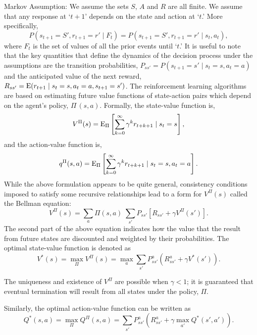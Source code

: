 \noindent Markov Assumption: We assume the sets $S$, $A$ and $R$ are all finite. We assume that any response at `$t+1$' depends on the state and action at `$t$.' More specifically, 
	\begin{equation} \label{eqn:pstpone}
	P(s_{t+1}=S', r_{t+1}=r'  \;|\; F_t)= P(s_{t+1}=S', r_{t+1}=r'  \;|\; s_t,a_t),
	\end{equation}
where $F_t$ is the set of values of all the prior events until `$t$.' It is useful to note that the key quantities that define the dynamics of the decision process under the assumptions are the transition probabilities, $P_{ss'}= P(s_{t+1}=s' \;|\; s_t=s, a_t=a)$ and the anticipated value of the next reward, $R_{ss'}= \operatorname{E}(r_{t+1} \;|\; s_t= s, a_t= a, s_{t+1}= s')$. The reinforcement learning algorithms are based on estimating future value functions of state-action pairs which depend on the agent's policy, $\Pi\, (s,a)$. Formally, the state-value function is,
	\begin{equation} \label{eqn:statevalue}
	V^\Pi(s)= \Ex_\Pi \left[ \sum_{k=0}^\infty \gamma^k r_{t+k+1} \;|\; s_t=s \right],
	\end{equation}
and the action-value function is,
	\begin{equation} \label{eqn:actionvalue}
	q^\Pi(s,a)= \Ex_\Pi \left[ \sum_{k=0}^\infty \gamma^k r_{t+k+1} \;|\; s_t=s, a_t=a \right].
	\end{equation}
While the above formulation appears to be quite general, consistency conditions imposed to satisfy some recursive relationships lead to a form for $V^\Pi(s)$ called the Bellman equation:
	\begin{equation} \label{eqn:vprods}
	V^\Pi(s)= \sum_a \Pi (s,a) \; \sum_{s'} P_{ss'} [ R_{ss'} + \gamma V^\Pi(s')].
	\end{equation}
The second part of the above equation indicates how the value that the result from future states are discounted and weighted by their probabilities. The optimal state-value function is denoted as
	\begin{equation} \label{eqn:statevstar}
	V^*(s)= \max_\Pi V^\Pi(s)= \max_a \sum_{s'} P_{ss'}^a(R_{ss'}^a + \gamma V^*(s')).
	\end{equation}

The uniqueness and existence of $V^\Pi$ are possible when $\gamma < 1$; it is guaranteed that eventual termination will result from all states under the policy, $\Pi$. \twomedskip


Similarly, the optimal action-value function can be written as
	\begin{equation} \label{eqn:actionvalueqstar}
	Q^*(s,a)= \max_\Pi Q^\Pi(s,a)= \sum_{s'} P_{ss'}^a( R_{ss'}^a + \gamma \max_{a'} Q^*(s',a') ).
	\end{equation}


